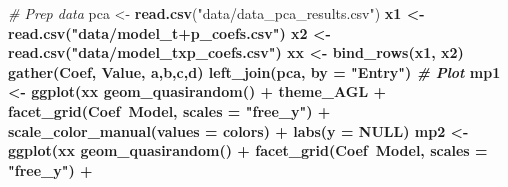 \documentclass[
]{article}
\newenvironment{Shaded}{\begin{snugshade}}{\end{snugshade}}
\newcommand{\CommentTok}[1]{\textcolor[rgb]{0.56,0.35,0.01}{\textit{#1}}}
\newcommand{\DataTypeTok}[1]{\textcolor[rgb]{0.13,0.29,0.53}{#1}}
\newcommand{\KeywordTok}[1]{\textcolor[rgb]{0.13,0.29,0.53}{\textbf{#1}}}
\newcommand{\NormalTok}[1]{#1}
\newcommand{\OperatorTok}[1]{\textcolor[rgb]{0.81,0.36,0.00}{\textbf{#1}}}
\newcommand{\OtherTok}[1]{\textcolor[rgb]{0.56,0.35,0.01}{#1}}
\newcommand{\StringTok}[1]{\textcolor[rgb]{0.31,0.60,0.02}{#1}}
\begin{document}
\begin{Shaded}
\begin{Highlighting}[]
\CommentTok{# Prep data}
\NormalTok{pca <-}\StringTok{ }\KeywordTok{read.csv}\NormalTok{(}\StringTok{"data/data_pca_results.csv"}\NormalTok{) }\OperatorTok{%
\NormalTok{x1 <-}\StringTok{ }\KeywordTok{read.csv}\NormalTok{(}\StringTok{"data/model_t+p_coefs.csv"}\NormalTok{) }\OperatorTok{%
\NormalTok{x2 <-}\StringTok{ }\KeywordTok{read.csv}\NormalTok{(}\StringTok{"data/model_txp_coefs.csv"}\NormalTok{) }\OperatorTok{%
\NormalTok{xx <-}\StringTok{ }\KeywordTok{bind_rows}\NormalTok{(x1, x2) }\OperatorTok{%
\StringTok{  }\KeywordTok{gather}\NormalTok{(Coef, Value, a,b,c,d) }\OperatorTok{%
\StringTok{  }\KeywordTok{left_join}\NormalTok{(pca, }\DataTypeTok{by =} \StringTok{"Entry"}\NormalTok{) }\OperatorTok{%
\CommentTok{# Plot}
\NormalTok{mp1 <-}\StringTok{ }\KeywordTok{ggplot}\NormalTok{(xx}\OperatorTok{%
\StringTok{  }\KeywordTok{geom_quasirandom}\NormalTok{() }\OperatorTok{+}\StringTok{ }\NormalTok{theme_AGL }\OperatorTok{+}
\StringTok{  }\KeywordTok{facet_grid}\NormalTok{(Coef}\OperatorTok{~}\NormalTok{Model, }\DataTypeTok{scales =} \StringTok{"free_y"}\NormalTok{) }\OperatorTok{+}\StringTok{ }
\StringTok{  }\KeywordTok{scale_color_manual}\NormalTok{(}\DataTypeTok{values =}\NormalTok{ colors) }\OperatorTok{+}\StringTok{ }\KeywordTok{labs}\NormalTok{(}\DataTypeTok{y =} \OtherTok{NULL}\NormalTok{)}
\NormalTok{mp2 <-}\StringTok{ }\KeywordTok{ggplot}\NormalTok{(xx}\OperatorTok{%
\StringTok{  }\KeywordTok{geom_quasirandom}\NormalTok{() }\OperatorTok{+}\StringTok{ }
\StringTok{  }\KeywordTok{facet_grid}\NormalTok{(Coef}\OperatorTok{~}\NormalTok{Model, }\DataTypeTok{scales =} \StringTok{"free_y"}\NormalTok{) }\OperatorTok{+}\StringTok{ }
}}}}}}}}
\end{Highlighting}
\end{Shaded}
\end{document}
